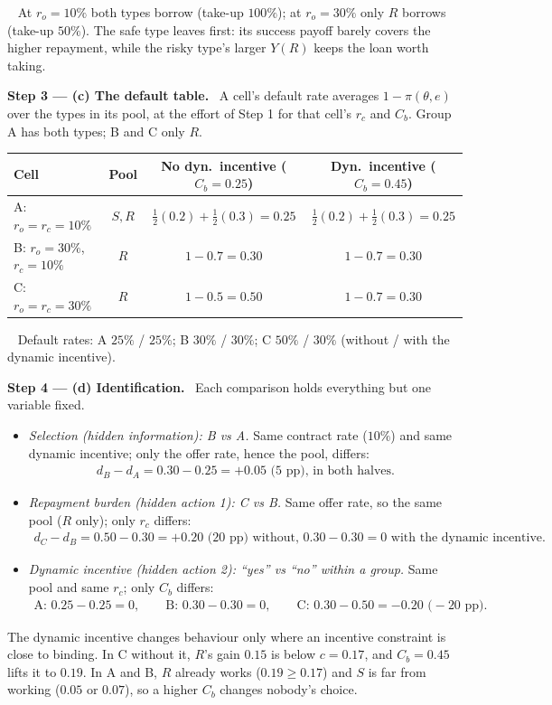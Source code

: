 \documentclass[11pt,a4paper]{article}
\newcommand{\step}[2]{\par\medskip\noindent\textbf{Step #1 --- #2.}~}
\newcommand{\answer}[1]{\par\smallskip\noindent\fbox{\textbf{Answer #1.}}~}
\begin{document}
\answer{(b)} At $r_o=10\%$ both types borrow (take-up $100\%$); at $r_o=30\%$ only $R$ borrows (take-up $50\%$).
The safe type leaves first: its success payoff barely covers the higher repayment, while the risky type's larger
$Y(R)$ keeps the loan worth taking.

\step{3}{(c) The default table} A cell's default rate averages $1-\pi(\theta,e)$ over the types in its pool, at
the effort of Step 1 for that cell's $r_c$ and $C_b$. Group A has both types; B and C only $R$.
\begin{center}
\begin{tabular}{lccc}
\toprule
Cell & Pool & No dyn.\ incentive ($C_b=0.25$) & Dyn.\ incentive ($C_b=0.45$)\\
\midrule
A: $r_o=r_c=10\%$ & $S,R$ & $\tfrac12(0.2)+\tfrac12(0.3)=0.25$ & $\tfrac12(0.2)+\tfrac12(0.3)=0.25$\\
B: $r_o=30\%$, $r_c=10\%$ & $R$ & $1-0.7=0.30$ & $1-0.7=0.30$\\
C: $r_o=r_c=30\%$ & $R$ & $1-0.5=0.50$ & $1-0.7=0.30$\\
\bottomrule
\end{tabular}
\end{center}

\answer{(c)} Default rates: A $25\%$ / $25\%$; B $30\%$ / $30\%$; C $50\%$ / $30\%$ (without / with the dynamic incentive).

\step{4}{(d) Identification} Each comparison holds everything but one variable fixed.
\begin{itemize}
  \item \emph{Selection (hidden information): B vs A.} Same contract rate ($10\%$) and same dynamic incentive;
        only the offer rate, hence the pool, differs:
        \begin{align}
          d_B-d_A = 0.30-0.25 = +0.05 \text{ (5 pp), in both halves.} \label{t4e18-sel}
        \end{align}
  \item \emph{Repayment burden (hidden action 1): C vs B.} Same offer rate, so the same pool ($R$ only); only $r_c$ differs:
        \begin{align}
          d_C-d_B = 0.50-0.30 = +0.20 \text{ (20 pp) without, } 0.30-0.30=0 \text{ with the dynamic incentive.} \label{t4e18-bur}
        \end{align}
  \item \emph{Dynamic incentive (hidden action 2): ``yes'' vs ``no'' within a group.} Same pool and same $r_c$; only $C_b$ differs:
        \begin{align}
          \text{A: } 0.25-0.25=0,\qquad \text{B: } 0.30-0.30=0,\qquad \text{C: } 0.30-0.50=-0.20 \text{ (}-20\text{ pp).} \label{t4e18-dyn}
        \end{align}
\end{itemize}
The dynamic incentive changes behaviour only where an incentive constraint is close to binding. In C without
it, $R$'s gain $0.15$ is below $c=0.17$, and $C_b=0.45$ lifts it to $0.19$. In A and B, $R$ already works
($0.19\ge0.17$) and $S$ is far from working ($0.05$ or $0.07$), so a higher $C_b$ changes nobody's choice.
\end{document}
